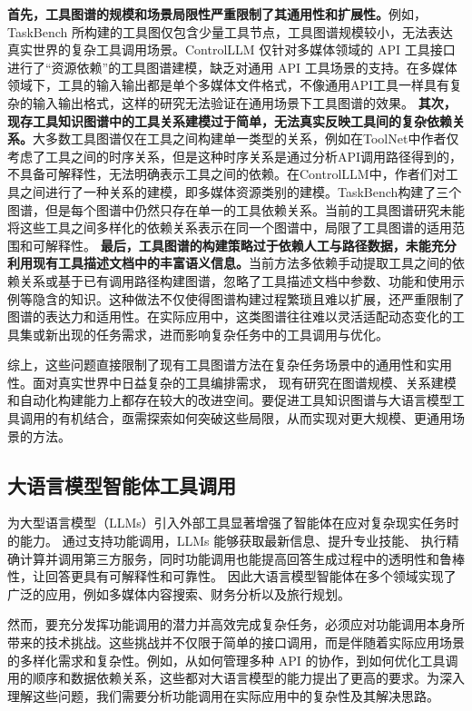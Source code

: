 \textbf{首先，工具图谱的规模和场景局限性严重限制了其通用性和扩展性。}例如，TaskBench\cite{shen2023taskbench} 所构建的工具图仅包含少量工具节点，工具图谱规模较小，无法表达真实世界的复杂工具调用场景。ControlLLM\cite{Liu2023a} 仅针对多媒体领域的 API 工具接口进行了“资源依赖”的工具图谱建模，缺乏对通用 API 工具场景的支持。在多媒体领域下，工具的输入输出都是单个多媒体文件格式，不像通用API工具一样具有复杂的输入输出格式，这样的研究无法验证在通用场景下工具图谱的效果。
\textbf{其次，现存工具知识图谱中的工具关系建模过于简单，无法真实反映工具间的复杂依赖关系。}大多数工具图谱仅在工具之间构建单一类型的关系，例如在ToolNet中作者仅考虑了工具之间的时序关系\cite{Liu2024}，但是这种时序关系是通过分析API调用路径得到的，不具备可解释性，无法明确表示工具之间的依赖。在ControlLLM\cite{Liu2023a}中，作者们对工具之间进行了一种关系的建模，即多媒体资源类别的建模。TaskBench\cite{shen2023taskbench}构建了三个图谱，但是每个图谱中仍然只存在单一的工具依赖关系。当前的工具图谱研究未能将这些工具之间多样化的依赖关系表示在同一个图谱中，局限了工具图谱的适用范围和可解释性。
\textbf{最后，工具图谱的构建策略过于依赖人工与路径数据，未能充分利用现有工具描述文档中的丰富语义信息。}当前方法多依赖手动提取工具之间的依赖关系或基于已有调用路径构建图谱，忽略了工具描述文档中参数、功能和使用示例等隐含的知识。这种做法不仅使得图谱构建过程繁琐且难以扩展，还严重限制了图谱的表达力和适用性。在实际应用中，这类图谱往往难以灵活适配动态变化的工具集或新出现的任务需求，进而影响复杂任务中的工具调用与优化。

综上，这些问题直接限制了现有工具图谱方法在复杂任务场景中的通用性和实用性。面对真实世界中日益复杂的工具编排需求，
现有研究在图谱规模、关系建模和自动化构建能力上都存在较大的改进空间。要促进工具知识图谱与大语言模型工具调用的有机结合，亟需探索如何突破这些局限，从而实现对更大规模、更通用场景的方法。

\subsection{大语言模型智能体工具调用}

为大型语言模型（LLMs）引入外部工具显著增强了智能体在应对复杂现实任务时的能力\cite{huang2024planning, Qin2023, qu2024tool}。
通过支持功能调用，LLMs 能够获取最新信息、提升专业技能、
执行精确计算并调用第三方服务，同时功能调用也能提高回答生成过程中的透明性和鲁棒性，让回答更具有可解释性和可靠性。
因此大语言模型智能体在多个领域实现了广泛的应用，例如多媒体内容搜索\cite{Song2023}、财务分析\cite{theuma2024equipping}以及旅行规划\cite{hao2024large}。

然而，要充分发挥功能调用的潜力并高效完成复杂任务，必须应对功能调用本身所带来的技术挑战。这些挑战并不仅限于简单的接口调用，而是伴随着实际应用场景的多样化需求和复杂性。例如，从如何管理多种 API 的协作，到如何优化工具调用的顺序和数据依赖关系，这些都对大语言模型的能力提出了更高的要求\cite{huang2024planning, Qin2023}。为深入理解这些问题，我们需要分析功能调用在实际应用中的复杂性及其解决思路。

